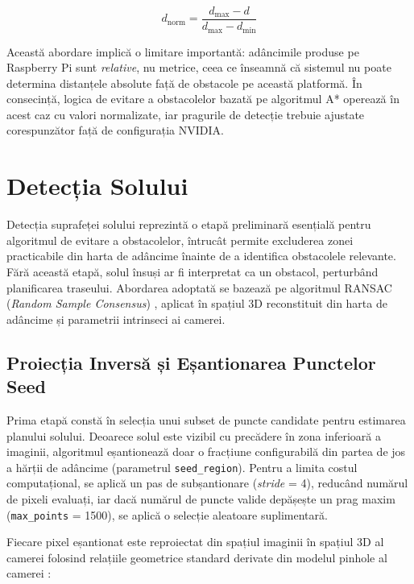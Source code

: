 \begin{equation}
    d_{\text{norm}} = \frac{d_{\max} - d}{d_{\max} - d_{\min}}
\end{equation}

\par Această abordare implică o limitare importantă: adâncimile produse pe Raspberry Pi sunt \textit{relative}, nu metrice, ceea ce înseamnă că sistemul nu poate determina distanțele absolute față de obstacole pe această platformă. În consecință, logica de evitare a obstacolelor bazată pe algoritmul A* \cite{4082128} operează în acest caz cu valori normalizate, iar pragurile de detecție trebuie ajustate corespunzător față de configurația NVIDIA.

\section{Detecția Solului}
\label{sec:ch3sec5}

\par Detecția suprafeței solului reprezintă o etapă preliminară esențială pentru algoritmul de evitare a obstacolelor, întrucât permite excluderea zonei practicabile din harta de adâncime înainte de a identifica obstacolele relevante. Fără această etapă, solul însuși ar fi interpretat ca un obstacol, perturbând planificarea traseului. Abordarea adoptată se bazează pe algoritmul RANSAC (\textit{Random Sample Consensus}) \cite{10.1145/358669.358692}, aplicat în spațiul 3D reconstituit din harta de adâncime și parametrii intrinseci ai camerei.

\subsection{Proiecția Inversă și Eșantionarea Punctelor Seed}

\par Prima etapă constă în selecția unui subset de puncte candidate pentru estimarea planului solului. Deoarece solul este vizibil cu precădere în zona inferioară a imaginii, algoritmul eșantionează doar o fracțiune configurabilă din partea de jos a hărții de adâncime (parametrul \texttt{seed\_region}). Pentru a limita costul computațional, se aplică un pas de subșantionare (\textit{stride} = 4), reducând numărul de pixeli evaluați, iar dacă numărul de puncte valide depășește un prag maxim (\texttt{max\_points} = 1500), se aplică o selecție aleatoare suplimentară.

\par Fiecare pixel eșantionat este reproiectat din spațiul imaginii în spațiul 3D al camerei folosind relațiile geometrice standard derivate din modelul pinhole al camerei \cite{hartley2004}:

